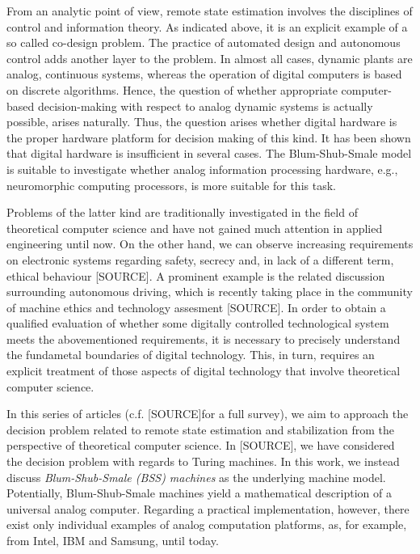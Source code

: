 \documentclass[conference]{IEEEtran}
\newcommand{\sdummy}{{\color{red}[SOURCE]}}
\begin{document}
	From an analytic point of view, remote state estimation involves the disciplines of control and information theory. As indicated above, it is an explicit example of a so 
	called co-design problem. The practice of automated design and autonomous control adds another layer to the problem. In almost all cases, dynamic plants are analog, continuous  systems, 
	whereas the operation of digital computers is based on discrete algorithms. Hence, the question of whether appropriate computer-based decision-making with respect to analog 
	dynamic systems is actually possible, arises naturally. Thus, the question arises whether digital hardware is the proper hardware platform for decision making of this kind. It has been shown
	that digital hardware is insufficient in several cases. The Blum-Shub-Smale model is suitable to investigate whether analog information processing hardware, e.g., neuromorphic computing
	processors, is more suitable for this task.

	Problems of the latter kind are traditionally investigated in the field of theoretical computer science and have not gained much attention in applied engineering until now. 
	On the other hand, we can observe increasing requirements on electronic systems regarding safety, secrecy and, in lack of a different term, ethical behaviour \sdummy. 
	A prominent example is the related discussion surrounding autonomous driving, which is recently taking place in the community of machine ethics and technology assesment \sdummy. 
	In order to obtain a qualified evaluation of whether some digitally controlled technological system meets the abovementioned requirements, it is necessary to precisely understand 
	the fundametal boundaries of digital technology. This, in turn, requires an explicit treatment of those aspects of digital technology that involve theoretical computer science.

	In this series of articles (c.f. \sdummy for a full survey), we aim to approach the decision problem related to remote state estimation and stabilization from the perspective 
	of theoretical computer science. In \sdummy, we have considered the decision problem with regards to Turing machines. In this work, we instead discuss 
	\emph{Blum-Shub-Smale (BSS) machines} as the underlying machine model. Potentially, Blum-Shub-Smale machines yield a mathematical description of a universal analog computer.
	Regarding a practical implementation, however, there exist only individual examples of analog computation platforms, as, for example, from Intel, IBM and Samsung, until today. 
	
\end{document}
